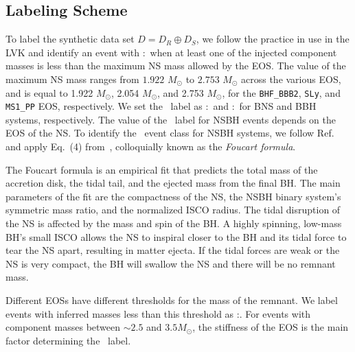 \subsection{Labeling Scheme}


To label the synthetic data set $D=D_R\oplus D_S$, we follow the practice in use in the \ac{LVK} and identify an event with \hasns:\true\ when at least one of the injected component masses
is less than the maximum \ac{NS} mass allowed by the \ac{EOS}. The value of the maximum \ac{NS} mass ranges from $1.922$ $M_{\odot}$ to $2.753$ $M_{\odot}$ across the various \ac{EOS}, and is equal to
1.922 $M_\odot$, 2.054 $M_\odot$, and 2.753 $M_\odot$, for the {\tt BHF\_BBB2}, {\tt SLy}, and {\tt MS1\_PP} \ac{EOS}, respectively. We set the \hasrem\ label as \hasrem:\true\ and \hasrem:\false\ for \ac{BNS} and \ac{BBH} systems, respectively. The value of the \hasrem\
label for \ac{NSBH} events depends on the \ac{EOS} of the \ac{NS}. To identify the \hasrem\ event class for \ac{NSBH} systems,  we follow Ref.~\cite{Chatterjee:2019avs} and apply Eq.~(4)
from~\cite{Foucart:2018rjc}, colloquially known as the \emph{Foucart formula}.

The Foucart formula is an empirical fit that predicts the total mass of the accretion disk, the tidal tail, and the ejected mass from the final \ac{BH}. The main parameters of the fit are
the compactness of the \ac{NS},  the \ac{NSBH} binary system's symmetric mass ratio, and the normalized \ac{ISCO} radius. The tidal disruption of the \ac{NS} is affected by the mass and spin of the \ac{BH}. A highly spinning, low-mass \ac{BH}'s small ISCO allows the \ac{NS} to inspiral closer to the \ac{BH} and its tidal force to tear the \ac{NS} apart, resulting in matter ejecta. If the tidal forces are weak or the \ac{NS} is very compact, the \ac{BH} will swallow the \ac{NS} and there will be no remnant mass.

Different \ac{EOS}s have different thresholds for the mass of the remnant. We label events with inferred masses less than this threshold as \hasrem:\true. For events with component masses between $\sim 2.5$ and $3.5 M_{\odot}$, the stiffness of the \ac{EOS} is the main factor determining the \hasrem\ label.
